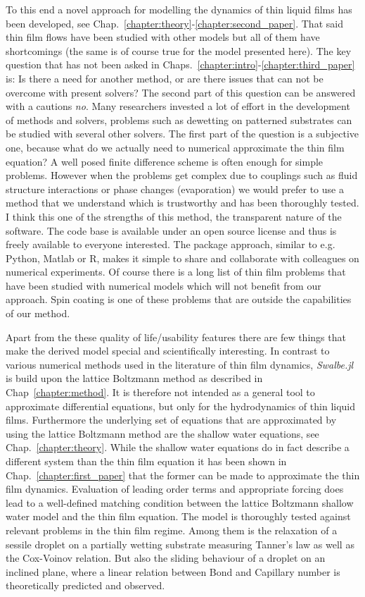 To this end a novel approach for modelling the dynamics of thin liquid films has been developed, see Chap.~\ref{chapter:theory}-\ref{chapter:second_paper}.
That said thin film flows have been studied with other models but all of them have shortcomings (the same is of course true for the model presented here).
The key question that has not been asked in Chaps.~\ref{chapter:intro}-\ref{chapter:third_paper} is: Is there a need for another method, or are there issues that can not be overcome with present solvers? 
The second part of this question can be answered with a cautions \textit{no}.
Many researchers invested a lot of effort in the development of methods and solvers, problems such as dewetting on patterned substrates can be studied with several other solvers.
The first part of the question is a subjective one, because what do we actually need to numerical approximate the thin film equation?
A well posed finite difference scheme is often enough for simple problems.
However when the problems get complex due to couplings such as fluid structure interactions or phase changes (evaporation) we would prefer to use a method that we understand which is trustworthy and has been thoroughly tested. 
I think this one of the strengths of this method, the transparent nature of the software. 
The code base is available under an open source license and thus is freely available to everyone interested.
The package approach, similar to e.g. Python, Matlab or R, makes it simple to share and collaborate with colleagues on numerical experiments.
Of course there is a long list of thin film problems that have been studied with numerical models which will not benefit from our approach.
Spin coating is one of these problems that are outside the capabilities of our method.  

Apart from the these quality of life/usability features there are few things that make the derived model special and scientifically interesting.
In contrast to various numerical methods used in the literature of thin film dynamics, \textit{Swalbe.jl} is build upon the lattice Boltzmann method as described in Chap~\ref{chapter:method}.
It is therefore not intended as a general tool to approximate differential equations, but only for the hydrodynamics of thin liquid films.
Furthermore the underlying set of equations that are approximated by using the lattice Boltzmann method are the shallow water equations, see Chap.~\ref{chapter:theory}.
While the shallow water equations do in fact describe a different system than the thin film equation it has been shown in Chap.~\ref{chapter:first_paper} that the former can be made to approximate the thin film dynamics.
Evaluation of leading order terms and appropriate forcing does lead to a well-defined matching condition between the lattice Boltzmann shallow water model and the thin film equation.
The model is thoroughly tested against relevant problems in the thin film regime. 
Among them is the relaxation of a sessile droplet on a partially wetting substrate measuring Tanner's law as well as the Cox-Voinov relation.
But also the sliding behaviour of a droplet on an inclined plane, where a linear relation between Bond and Capillary number is theoretically predicted and observed.

